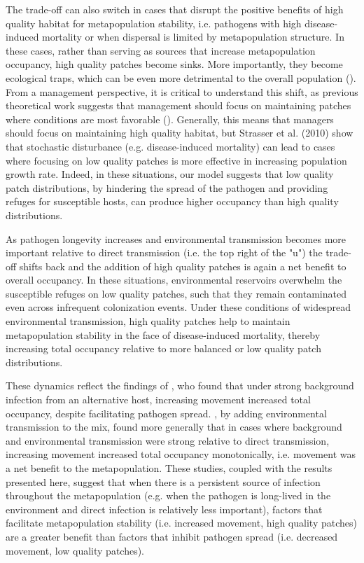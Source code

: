 \documentclass{article}
\begin{document}
The trade-off can also switch in cases that disrupt the positive benefits of high quality habitat for metapopulation stability, i.e. pathogens with high disease-induced mortality or when dispersal is limited by metapopulation structure.  In these cases, rather than serving as sources that increase metapopulation occupancy, high quality patches become sinks.  More importantly, they become ecological traps, which can be even more detrimental to the overall population (\cite{Kristan2003}).  From a management perspective, it is critical to understand this shift, as previous theoretical work suggests that management should focus on maintaining patches where conditions are most favorable (\cite{Strasser2010}).  Generally, this means that managers should focus on maintaining high quality habitat, but Strasser et al. (2010) show that stochastic disturbance (e.g. disease-induced mortality) can lead to cases where focusing on low quality patches is more effective in increasing population growth rate.  Indeed, in these situations, our model suggests that low quality patch distributions, by hindering the spread of the pathogen and providing refuges for susceptible hosts, can produce higher occupancy than high quality distributions.  

As pathogen longevity increases and environmental transmission becomes more important relative to direct transmission (i.e. the top right of the "u") the trade-off shifts back and the addition of high quality patches is again a net benefit to overall occupancy.  In these situations, environmental reservoirs overwhelm the susceptible refuges on low quality patches, such that they remain contaminated even across infrequent colonization events.  Under these conditions of widespread environmental transmission, high quality patches help to maintain metapopulation stability in the face of disease-induced mortality, thereby increasing total occupancy relative to more balanced or low quality patch distributions.  

These dynamics reflect the findings of \cite{Gog2002}, who found that under strong background infection from an alternative host, increasing movement increased total occupancy, despite facilitating pathogen spread.  \cite{Park2012}, by adding environmental transmission to the mix, found more generally that in cases where background and environmental transmission were strong relative to direct transmission, increasing movement increased total occupancy monotonically, i.e. movement was a net benefit to the metapopulation.  These studies, coupled with the results presented here, suggest that when there is a persistent source of infection throughout the metapopulation (e.g. when the pathogen is long-lived in the environment and direct infection is relatively less important), factors that facilitate metapopulation stability (i.e. increased movement, high quality patches) are a greater benefit than factors that inhibit pathogen spread (i.e. decreased movement, low quality patches).   
\end{document}
